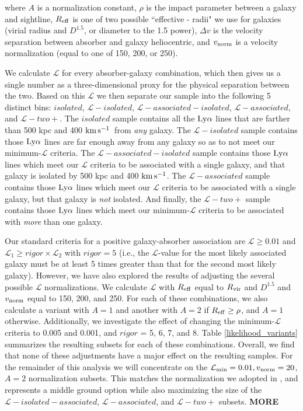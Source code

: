 \documentclass[twocolumn,tighten]{aastex62}
\newcommand{\kms}{$\rm km\, s^{-1}$}
\begin{document}
\noindent where $A$ is a normalization constant, $\rho$ is the impact parameter between a galaxy and sightline, $R_{\rm eff}$ is one of two possible ``effective - radii" we use for galaxies (virial radius and $D^{1.5}$, or diameter to the 1.5 power), $\Delta v$ is the velocity separation between absorber and galaxy heliocentric, and $v_{\rm norm}$ is a velocity normalization (equal to one of 150, 200, or 250). 

We calculate $\mathcal{L}$ for every absorber-galaxy combination, which then gives us a single number as a three-dimensional proxy for the physical separation between the two. Based on this $\mathcal{L}$ we then separate our sample into the following 5 distinct bins: $isolated$, $\mathcal{L}-isolated$, $\mathcal{L}-associated-isolated$, $\mathcal{L}-associated$, and $\mathcal{L}-two+$. The $isolated$ sample contains all the $\rm Ly\alpha$ lines that are farther than 500 kpc and 400 \kms~from \emph{any} galaxy. The $\mathcal{L}-isolated$ sample contains those $\rm Ly\alpha$ lines are far enough away from any galaxy so as to not meet our minimum-$\mathcal{L}$ criteria. The $\mathcal{L}-associated-isolated$ sample contains those $\rm Ly\alpha$ lines which meet our $\mathcal{L}$ criteria to be associated with a single galaxy, and that galaxy is isolated by 500 kpc and 400 \kms. The $\mathcal{L}-associated$ sample contains those $\rm Ly\alpha$ lines which meet our $\mathcal{L}$ criteria to be associated with a single galaxy, but that galaxy is \emph{not} isolated. And finally, the $\mathcal{L}-two+$ sample contains those  $\rm Ly\alpha$ lines which meet our minimum-$\mathcal{L}$ criteria to be associated with \emph{more} than one galaxy.

Our standard criteria for a positive galaxy-absorber association are $\mathcal{L} \geq 0.01$ and $\mathcal{L}_1 \geq rigor \times \mathcal{L}_2$ with $rigor =5$ (i.e., the $\mathcal{L}$-value for the most likely associated galaxy must be at least 5 times greater than that for the second most likely galaxy). However, we have also explored the results of adjusting the several possible $\mathcal{L}$ normalizations. We calculate $\mathcal{L}$ with $R_{\rm eff}$ equal to $R_{\rm vir}$ and $D^{1.5}$ and $v_{\rm norm}$ equal to 150, 200, and 250. For each of these combinations, we also calculate a variant with $A =1$ and another with $A = 2$ if $R_{\rm eff} \ge \rho$, and $A=1$ otherwise. Additionally, we investigate the effect of changing the minimum-$\mathcal{L}$ criteria to 0.005 and 0.001, and $rigor$ = 5, 6, 7, and 8. Table \ref{likelihood_variants} summarizes the resulting subsets for each of these combinations. Overall, we find that none of these adjustments have a major effect on the resulting samples. For the remainder of this analysis we will concentrate on the $\mathcal{L}_{\rm min} = 0.01, v_{\rm norm} = 20$, $A = 2$ normalization subsets. This matches the normalization we adopted in \cite{french2017}, and represents a middle ground option while also maximizing the size of the $\mathcal{L}-isolated-associated$, $\mathcal{L}-associated$, and $\mathcal{L}-two+$ subsets. \textbf{MORE}
\end{document}
